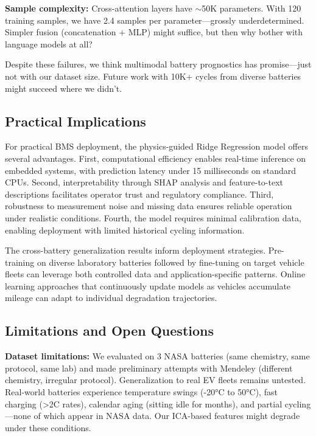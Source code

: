 \documentclass{sn-jnl}
\begin{document}
\textbf{Sample complexity:} Cross-attention layers have $\sim$50K parameters. With 120 training samples, we have 2.4 samples per parameter—grossly underdetermined. Simpler fusion (concatenation + MLP) might suffice, but then why bother with language models at all?

Despite these failures, we think multimodal battery prognostics has promise—just not with our dataset size. Future work with 10K+ cycles from diverse batteries might succeed where we didn't.

\subsection{Practical Implications}
\label{subsec:implications}

For practical BMS deployment, the physics-guided Ridge Regression model offers several advantages. First, computational efficiency enables real-time inference on embedded systems, with prediction latency under 15 milliseconds on standard CPUs. Second, interpretability through SHAP analysis and feature-to-text descriptions facilitates operator trust and regulatory compliance. Third, robustness to measurement noise and missing data ensures reliable operation under realistic conditions. Fourth, the model requires minimal calibration data, enabling deployment with limited historical cycling information.

The cross-battery generalization results inform deployment strategies. Pre-training on diverse laboratory batteries followed by fine-tuning on target vehicle fleets can leverage both controlled data and application-specific patterns. Online learning approaches that continuously update models as vehicles accumulate mileage can adapt to individual degradation trajectories.

\subsection{Limitations and Open Questions}
\label{subsec:limitations}

\textbf{Dataset limitations:} We evaluated on 3 NASA batteries (same chemistry, same protocol, same lab) and made preliminary attempts with Mendeley (different chemistry, irregular protocol). Generalization to real EV fleets remains untested. Real-world batteries experience temperature swings (-20°C to 50°C), fast charging (>2C rates), calendar aging (sitting idle for months), and partial cycling—none of which appear in NASA data. Our ICA-based features might degrade under these conditions.
\end{document}
